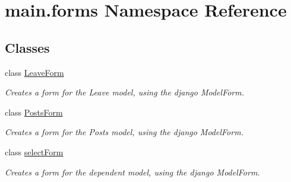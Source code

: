 \hypertarget{namespacemain_1_1forms}{}\section{main.\+forms Namespace Reference}
\label{namespacemain_1_1forms}
\subsection*{Classes}
\begin{DoxyCompactItemize}
\item 
class \hyperlink{classmain_1_1forms_1_1LeaveForm}{Leave\+Form}
\begin{DoxyCompactList}\small\item\em Creates a form for the Leave model, using the django Model\+Form. \end{DoxyCompactList}\item 
class \hyperlink{classmain_1_1forms_1_1PostsForm}{Posts\+Form}
\begin{DoxyCompactList}\small\item\em Creates a form for the Posts model, using the django Model\+Form. \end{DoxyCompactList}\item 
class \hyperlink{classmain_1_1forms_1_1selectForm}{select\+Form}
\begin{DoxyCompactList}\small\item\em Creates a form for the dependent model, using the django Model\+Form. \end{DoxyCompactList}\end{DoxyCompactItemize}
